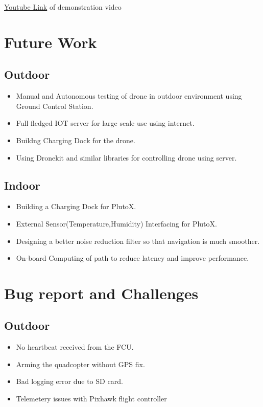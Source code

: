 \documentclass[a4paper,12pt,oneside]{book}
\begin{document}
\href{https://www.youtube.com/watch?v=DnNQvGCwf-I}{Youtube Link} of demonstration video 

\section{Future Work}
\subsection{Outdoor}
\begin{itemize}
\item Manual and Autonomous testing of drone in outdoor environment using Ground Control Station. 
\item Full fledged IOT server for large scale use using internet.
\item Buildng Charging Dock for the drone.
\item Using Dronekit and similar libraries for controlling drone using server.
\end{itemize}
\subsection{Indoor}
\begin{itemize}
\item Building a Charging Dock for PlutoX.
\item External Sensor(Temperature,Humidity) Interfacing for PlutoX.
\item Designing a better noise reduction filter so that navigation is much smoother.
\item On-board Computing of path to reduce latency and improve performance.
\end{itemize}

\section{Bug report and Challenges}
\subsection{Outdoor}
\begin{itemize}
\item No heartbeat received from the FCU.
\item Arming the quadcopter without GPS fix.
\item Bad logging error due to SD card.
\item Telemetery issues with Pixhawk flight controller
\end{itemize}
\end{document}

